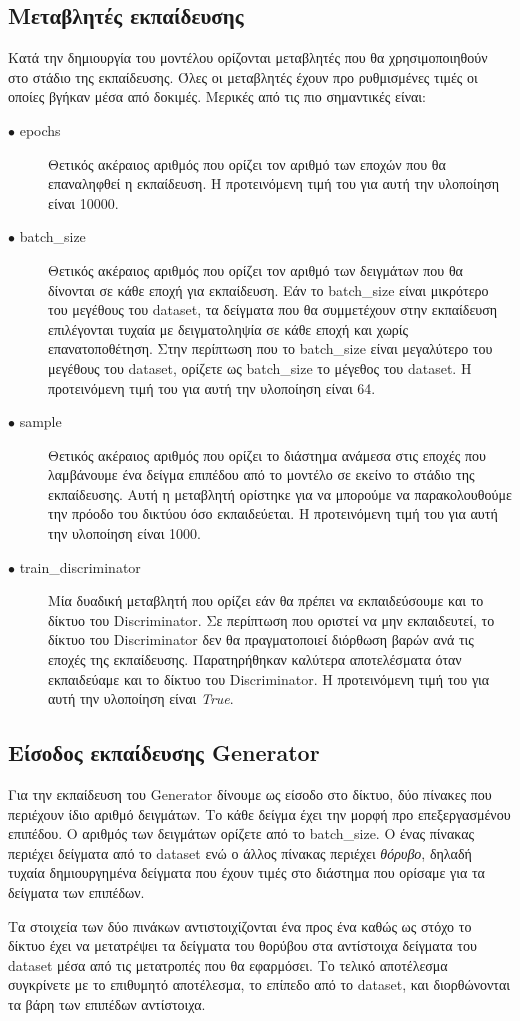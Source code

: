 \subsection{Μεταβλητές εκπαίδευσης}
Κατά την δημιουργία του μοντέλου ορίζονται μεταβλητές που θα χρησιμοποιηθούν στο στάδιο της εκπαίδευσης. Όλες οι μεταβλητές έχουν προ ρυθμισμένες τιμές οι οποίες βγήκαν μέσα από δοκιμές. Μερικές από τις πιο σημαντικές είναι:

\begin{description}
\item[$\bullet$ epochs] Θετικός ακέραιος αριθμός που ορίζει τον αριθμό των εποχών που θα επαναληφθεί η εκπαίδευση. Η προτεινόμενη τιμή του για αυτή την υλοποίηση είναι 10000.
\item[$\bullet$ batch\_size] Θετικός ακέραιος αριθμός που ορίζει τον αριθμό των δειγμάτων που θα δίνονται σε κάθε εποχή για εκπαίδευση. Εάν το batch\_size είναι μικρότερο του μεγέθους του dataset, τα δείγματα που θα συμμετέχουν στην εκπαίδευση επιλέγονται τυχαία με δειγματοληψία σε κάθε εποχή και χωρίς επανατοποθέτηση. Στην περίπτωση που το batch\_size είναι μεγαλύτερο του μεγέθους του dataset, ορίζετε ως batch\_size το μέγεθος του dataset. Η προτεινόμενη τιμή του για αυτή την υλοποίηση είναι 64.
\item[$\bullet$ sample] Θετικός ακέραιος αριθμός που ορίζει το διάστημα ανάμεσα στις εποχές που λαμβάνουμε ένα δείγμα επιπέδου από το μοντέλο σε εκείνο το στάδιο της εκπαίδευσης. Αυτή η μεταβλητή ορίστηκε για να μπορούμε να παρακολουθούμε την πρόοδο του δικτύου όσο εκπαιδεύεται. Η προτεινόμενη τιμή του για αυτή την υλοποίηση είναι 1000.
\item[$\bullet$ train\_discriminator] Μία δυαδική μεταβλητή που ορίζει εάν θα πρέπει να εκπαιδεύσουμε και το δίκτυο του Discriminator. Σε περίπτωση που οριστεί να μην εκπαιδευτεί, το δίκτυο του Discriminator δεν θα πραγματοποιεί διόρθωση βαρών ανά τις εποχές της εκπαίδευσης. Παρατηρήθηκαν καλύτερα αποτελέσματα όταν εκπαιδεύαμε και το δίκτυο του Discriminator. Η προτεινόμενη τιμή του για αυτή την υλοποίηση είναι \textit{True}.
\end{description}

\subsection{Είσοδος εκπαίδευσης Generator}
Για την εκπαίδευση του Generator δίνουμε ως είσοδο στο δίκτυο, δύο πίνακες που περιέχουν ίδιο αριθμό δειγμάτων. Το κάθε δείγμα έχει την μορφή προ επεξεργασμένου επιπέδου. Ο αριθμός των δειγμάτων ορίζετε από το batch\_size. O ένας πίνακας περιέχει δείγματα από το dataset ενώ ο άλλος πίνακας περιέχει \textit{θόρυβο}, δηλαδή τυχαία δημιουργημένα δείγματα που έχουν τιμές στο διάστημα που ορίσαμε για τα δείγματα των επιπέδων. 
\par
Τα στοιχεία των δύο πινάκων αντιστοιχίζονται ένα προς ένα καθώς ως στόχο το δίκτυο έχει να μετατρέψει τα δείγματα του θορύβου στα αντίστοιχα δείγματα του dataset μέσα από τις μετατροπές που θα εφαρμόσει. Το τελικό αποτέλεσμα συγκρίνετε με το επιθυμητό αποτέλεσμα, το επίπεδο από το dataset, και διορθώνονται τα βάρη των επιπέδων αντίστοιχα.

